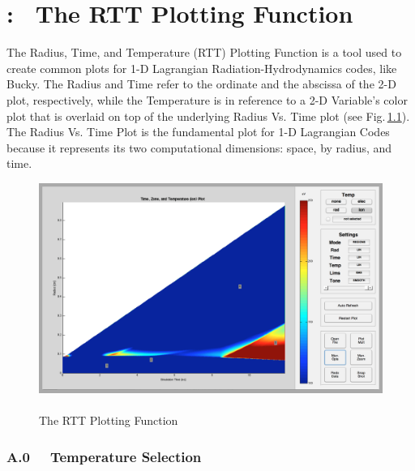 
\chapter[\textbf{The Radius, Time, and Temperature Plot}]{: \ The RTT Plotting Function}
\label{app:rtt}
The Radius, Time, and Temperature (RTT) Plotting Function is a tool used to create common plots for 1-D Lagrangian Radiation-Hydrodynamics codes, like Bucky.  The Radius and Time refer to the ordinate and the abscissa of the 2-D plot, respectively, while the Temperature is in reference to a 2-D Variable's color plot that is overlaid on top of the underlying Radius Vs. Time plot (see Fig.\,\ref{fig:basePlot}).  The Radius Vs. Time Plot is the fundamental plot for 1-D Lagrangian Codes because it represents its two computational dimensions: space, by radius, and time.


\begin{figure}	
	\centering
	\includegraphics[scale=.23]{graphics/basePlot.png} 
	\caption[The RTT Plotting Function]{ \\ The RTT Plotting Function \\  }
	\label{fig:basePlot}
\end{figure}

\subsection{A.0 \ \ Temperature Selection }

